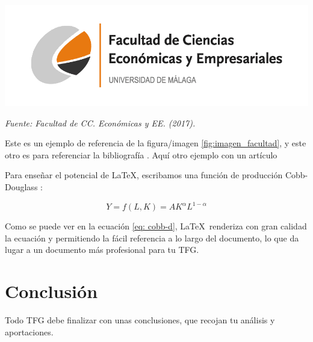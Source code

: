 \documentclass[13pt,a4paper]{report}
\begin{document}
\begin{center}
    \centering %
    \includegraphics[width=\linewidth]{logo.png} %
    \label{fig:imagen_facultad} %
    \par %
    \raggedright %
    {\fontsize{12}{14}\selectfont\textit{Fuente: Facultad de CC. Económicas y EE. (2017).}} %
\end{center}

\vspace{12pt}

Este es un ejemplo de referencia de la figura/imagen \ref{fig:imagen_facultad}, y este otro es para referenciar la bibliografía \citep{tfg_sample}. Aquí otro ejemplo con un artículo \citep{baccini2007edgeworth}

\vspace{12pt}

Para enseñar el potencial de \LaTeX, escribamos una función de producción Cobb-Douglass \citep{cobb_theory_1928}: 

\begin{equation}
    Y = f(L,K) = A K^\alpha L^{1-\alpha} \label{eq: cobb-d}
\end{equation}

\vspace{12pt}

Como se puede ver en la ecuación \ref{eq: cobb-d}, \LaTeX \ renderiza con gran calidad la ecuación y permitiendo la fácil referencia a lo largo del documento, lo que da lugar a un documento más profesional para tu TFG.

\section{Conclusión} 

\vspace{12pt}

Todo TFG debe finalizar con unas conclusiones, que recojan tu análisis y aportaciones.
\end{document}
